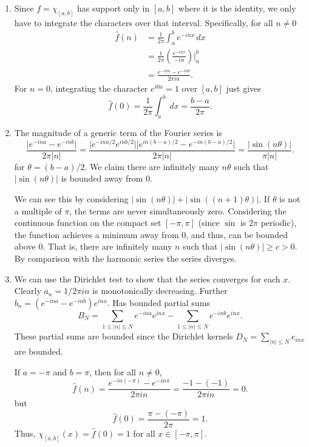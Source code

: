 \documentclass[12 pt, letterpaper]{hmcpset}
\begin{document}
\begin{solution}
	\begin{enumerate}
		\item Since $f = \chi_{[a, b]}$ has support only in $[a, b]$ where it is the identity, we only have to integrate the characters over that interval. Specifically, for all $n \neq 0$ 
			\begin{align*}
				\hat{f}(n) & = \frac{1}{2 \pi} \int_{a}^{b} e^{-i n x} \, dx \\
					   & = \frac{1}{2 \pi} \left ( \frac{e^{-i n x}}{-in} \right ) \Big |_{a}^{b} \\
					   & = \frac{e^{-i n a} - e^{-i n b}}{2 \pi i n}.
			\end{align*}
			For $n = 0$, integrating the character $e^{i 0 x} = 1$ over $[a, b]$ just gives
			\[
				\hat{f}(0) = \frac{1}{2 \pi} \int_{a}^{b}  \, dx = \frac{b - a}{2 \pi}.
			\]

		\item The magnitude of a generic term of the Fourier series is
			\[
				\frac{\lvert e^{-i n a} - e^{-i n b} \rvert}{2 \pi \lvert n \rvert} = \frac{\lvert e^{-i n a/2} e^{i n b/2} \rvert \lvert e^{i n (b - a)/2} - e^{-i n (b - a) / 2} \rvert}{2 \pi \lvert n \rvert} = \frac{\lvert \sin{(n \theta)} \rvert}{\pi \lvert n \rvert}.
			\]
			for $\theta = (b - a) / 2$. We claim there are infinitely many $n \theta$ such that $\lvert \sin{(n \theta)} \rvert$ is bounded away from $0$.

			We can see this by considering $\lvert \sin{(n \theta)} \rvert + \lvert \sin{((n + 1) \theta)} \rvert$. If $\theta$ is not a multiple of $\pi$, the terms are never simultaneously zero. Considering the continuous function on the compact set $[-\pi, \pi]$ (since $\sin$ is $2 \pi$ periodic), the function achieves a minimum away from $0$, and thus, can be bounded above $0$. That is, there are infinitely many $n$ such that $\lvert \sin{(n \theta)} \rvert \ge c > 0$. By comparison with the harmonic series the series diverges.

		\item We can use the Dirichlet test to show that the series converges for each $x$. Clearly $a_{n} = 1 / 2 \pi i n$ is monotonically decreasing. Further $b_{n} = (e^{-i n a} - e^{-i n b}) e^{i n x}$. Has bounded partial sums
			\[
				B_{N} = \sum_{1 \le \lvert n \rvert \le N} e^{-i n a} e^{i n x} - \sum_{1 \le \lvert n \rvert \le N} e^{-i n b} e^{i n x}.
			\]
			These partial sums are bounded since the Dirichlet kernels $D_{N} = \sum_{\lvert n \rvert \le N} e_{i n x}$ are bounded.

			If $a = -\pi$ and $b = \pi$, then for all $n \neq 0$,
			\[
				\hat{f}(n) = \frac{e^{-i n (-\pi)} - e^{-i n \pi}}{2 \pi i n} = \frac{-1 - (-1)}{2 \pi i n} = 0.
			\]
			but
			\[
				\hat{f}(0) = \frac{\pi - (-\pi)}{2 \pi} = 1.
			\]
			Thus, $\chi_{[a, b]}(x) = \hat{f}(0) = 1$ for all $x \in [-\pi, \pi]$.
	\end{enumerate}
\end{solution}
\end{document}
